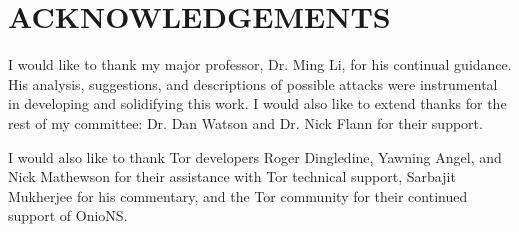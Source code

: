 

\chapter*{\Large ACKNOWLEDGEMENTS}


\doublespacing
\vspace{2pc}

I would like to thank my major professor, Dr. Ming Li, for his continual guidance. His analysis, suggestions, and descriptions of possible attacks were instrumental in developing and solidifying this work. I would also like to extend thanks for the rest of my committee: Dr. Dan Watson and Dr. Nick Flann for their support. 

I would also like to thank Tor developers Roger Dingledine, Yawning Angel, and Nick Mathewson for their assistance with Tor technical support, Sarbajit Mukherjee for his commentary, and the Tor community for their continued support of OnioNS.

\clearpage